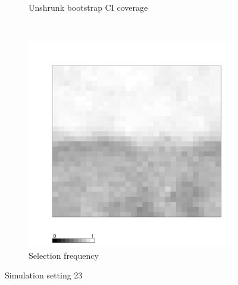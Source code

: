 \documentclass[authoryear, review, 11pt]{elsarticle}
\begin{document}
\begin{figure}
\begin{subfigure}[b]{0.45\textwidth}
		\caption{Unshrunk bootstrap CI coverage}
	\end{subfigure}%
	~ %
	\begin{subfigure}[b]{0.45\textwidth}
	\centering
		\includegraphics[width=\textwidth]{../../figures/simulation/X1.15.23.selection.pdf}
		\caption{Selection frequency}
	\end{subfigure}
	\caption{Simulation setting 23}
\end{figure}
\end{document}
